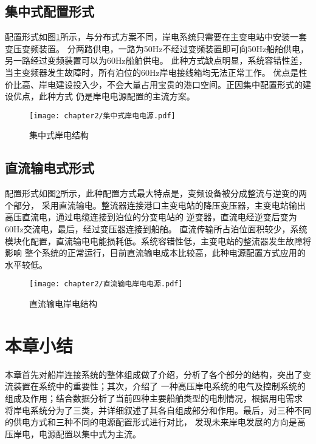 \subsection{集中式配置形式}

配置形式如图\ref{fig:集中式岸电结构}所示，与分布式方案不同，岸电系统只需要在主变电站中安装一套变压变频装置。
分两路供电，一路为50Hz不经过变频装置即可向50Hz船舶供电，另一路经过变频装置可以为60Hz船舶供电。
此种方式缺点明显，系统容错性差，当主变频器发生故障时，所有泊位的60Hz岸电接线箱均无法正常工作。
优点是性价比高、岸电建设投入少，不会大量占用宝贵的港口空间。正因集中配置形式的建设优点，此种方式
仍是岸电电源配置的主流方案。

\begin{figure}[!htp]
	\centering
	\texttt{[image: chapter2/集中式岸电电源.pdf]}
	\caption{集中式岸电结构}
	\label{fig:集中式岸电结构}
\end{figure}

\subsection{直流输电式形式}

配置形式如图\ref{fig:直流输电岸电结构}所示，此种配置方式最大特点是，变频设备被分成整流与逆变的两个部分，
采用直流输电。整流器连接港口主变电站的降压变压器，主变电站输出高压直流电，通过电缆连接到泊位的分变电站的
逆变器，直流电经逆变后变为60Hz交流电，最后，经过变压器连接到船舶。
直流传输所占泊位面积较少，系统模块化配置，直流输电电能损耗低。系统容错性低，主变电站的整流器发生故障将影响
整个系统的正常运行，目前直流输电成本比较高，此种电源配置方式应用的水平较低。

\begin{figure}[!htp]
	\centering
	\texttt{[image: chapter2/直流输电岸电电源.pdf]}
	\caption{直流输电岸电结构}
	\label{fig:直流输电岸电结构}
\end{figure}

\section{本章小结}

本章首先对船岸连接系统的整体组成做了介绍，分析了各个部分的结构，突出了变流装置在系统中的重要性；其次，介绍了
一种高压岸电系统的电气及控制系统的组成及作用；结合数据分析了当前四种主要船舶类型的电制情况，根据用电需求
将岸电系统分为了三类，并详细叙述了其各自组成部分和作用。最后，对三种不同的供电方式和三种不同的电源配置形式进行对比，
发现未来岸电发展的方向是高压岸电，电源配置以集中式为主流。

